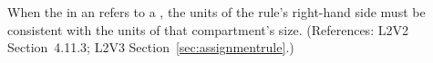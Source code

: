 When the  in an \AssignmentRule refers to a \Compartment,
the units of the rule's right-hand side must be consistent with the units
of that compartment's size.  (References: L2V2 Section~4.11.3;
L2V3 Section~\ref{sec:assignmentrule}.)
